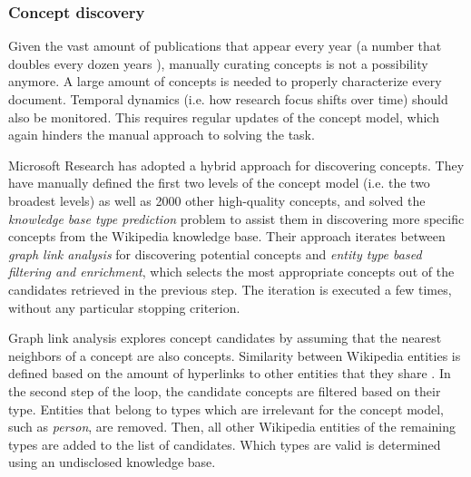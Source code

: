 \subsubsection{Concept discovery} \label{mag_concept_discovery}

Given the vast amount of publications that appear every year (a number that doubles every dozen years \cite{dong2017century}), manually curating concepts is not a possibility anymore. A large amount of concepts is needed to properly characterize every document. Temporal dynamics (i.e. how research focus shifts over time) should also be monitored. This requires regular updates of the concept model, which again hinders the manual approach to solving the task.

Microsoft Research has adopted a hybrid approach for discovering concepts. They have manually defined the first two levels of the concept model (i.e. the two broadest levels) as well as 2000 other high-quality concepts, and solved the \textit{knowledge base type prediction} problem to assist them in discovering more specific concepts from the Wikipedia knowledge base. Their approach iterates between \textit{graph link analysis} for discovering potential concepts and \textit{entity type based filtering and enrichment}, which selects the most appropriate concepts out of the candidates retrieved in the previous step. The iteration is executed a few times, without any particular stopping criterion.

Graph link analysis explores concept candidates by assuming that the nearest neighbors of a concept are also concepts. Similarity between Wikipedia entities is defined based on the amount of hyperlinks to other entities that they share \cite{witten2008effective}. In the second step of the loop, the candidate concepts are filtered based on their type. Entities that belong to types which are irrelevant for the concept model, such as \textit{person}, are removed. Then, all other Wikipedia entities of the remaining types are added to the list of candidates. Which types are valid is determined using an undisclosed knowledge base.